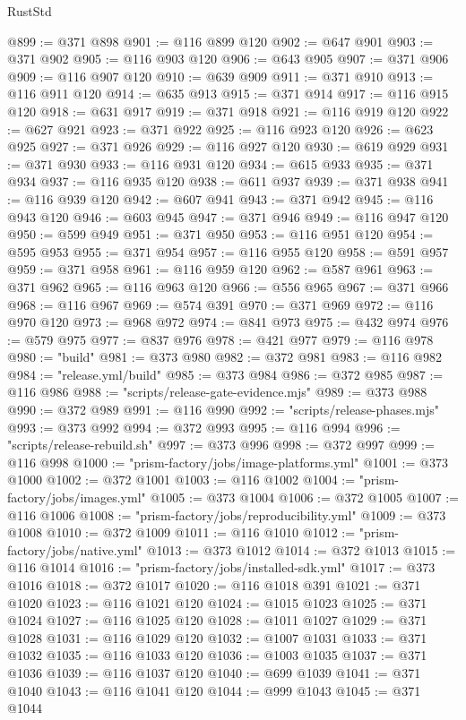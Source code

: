 \begin{lexlean}{RustStd}
\begin{coremodule}
@899 := @371 @898
@901 := @116 @899 @120
@902 := @647 @901
@903 := @371 @902
@905 := @116 @903 @120
@906 := @643 @905
@907 := @371 @906
@909 := @116 @907 @120
@910 := @639 @909
@911 := @371 @910
@913 := @116 @911 @120
@914 := @635 @913
@915 := @371 @914
@917 := @116 @915 @120
@918 := @631 @917
@919 := @371 @918
@921 := @116 @919 @120
@922 := @627 @921
@923 := @371 @922
@925 := @116 @923 @120
@926 := @623 @925
@927 := @371 @926
@929 := @116 @927 @120
@930 := @619 @929
@931 := @371 @930
@933 := @116 @931 @120
@934 := @615 @933
@935 := @371 @934
@937 := @116 @935 @120
@938 := @611 @937
@939 := @371 @938
@941 := @116 @939 @120
@942 := @607 @941
@943 := @371 @942
@945 := @116 @943 @120
@946 := @603 @945
@947 := @371 @946
@949 := @116 @947 @120
@950 := @599 @949
@951 := @371 @950
@953 := @116 @951 @120
@954 := @595 @953
@955 := @371 @954
@957 := @116 @955 @120
@958 := @591 @957
@959 := @371 @958
@961 := @116 @959 @120
@962 := @587 @961
@963 := @371 @962
@965 := @116 @963 @120
@966 := @556 @965
@967 := @371 @966
@968 := @116 @967
@969 := @574 @391
@970 := @371 @969
@972 := @116 @970 @120
@973 := @968 @972
@974 := @841 @973
@975 := @432 @974
@976 := @579 @975
@977 := @837 @976
@978 := @421 @977
@979 := @116 @978
@980 := "build"
@981 := @373 @980
@982 := @372 @981
@983 := @116 @982
@984 := "release.yml/build"
@985 := @373 @984
@986 := @372 @985
@987 := @116 @986
@988 := "scripts/release-gate-evidence.mjs"
@989 := @373 @988
@990 := @372 @989
@991 := @116 @990
@992 := "scripts/release-phases.mjs"
@993 := @373 @992
@994 := @372 @993
@995 := @116 @994
@996 := "scripts/release-rebuild.sh"
@997 := @373 @996
@998 := @372 @997
@999 := @116 @998
@1000 := "prism-factory/jobs/image-platforms.yml"
@1001 := @373 @1000
@1002 := @372 @1001
@1003 := @116 @1002
@1004 := "prism-factory/jobs/images.yml"
@1005 := @373 @1004
@1006 := @372 @1005
@1007 := @116 @1006
@1008 := "prism-factory/jobs/reproducibility.yml"
@1009 := @373 @1008
@1010 := @372 @1009
@1011 := @116 @1010
@1012 := "prism-factory/jobs/native.yml"
@1013 := @373 @1012
@1014 := @372 @1013
@1015 := @116 @1014
@1016 := "prism-factory/jobs/installed-sdk.yml"
@1017 := @373 @1016
@1018 := @372 @1017
@1020 := @116 @1018 @391
@1021 := @371 @1020
@1023 := @116 @1021 @120
@1024 := @1015 @1023
@1025 := @371 @1024
@1027 := @116 @1025 @120
@1028 := @1011 @1027
@1029 := @371 @1028
@1031 := @116 @1029 @120
@1032 := @1007 @1031
@1033 := @371 @1032
@1035 := @116 @1033 @120
@1036 := @1003 @1035
@1037 := @371 @1036
@1039 := @116 @1037 @120
@1040 := @699 @1039
@1041 := @371 @1040
@1043 := @116 @1041 @120
@1044 := @999 @1043
@1045 := @371 @1044

\end{coremodule}
\end{lexlean}
